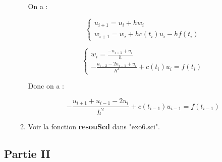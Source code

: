 \documentclass[12pt, letterpaper]{article}
\begin{document}
\begin{enumerate}
\begin{enumerate}
    On a :

    \begin{equation*}
      \left\{
      \begin{array}{l}
        u_{i+1} = u_i + h w_i \\
        w_{i+1} = w_i + h c(t_i) u_i - h f(t_i)
      \end{array}
      \right.
    \end{equation*}

    \begin{equation*}
      \left\{
      \begin{array}{l}
        w_i = \frac{- u_{i+1} + u_i}{h} \\
        - \frac{u_{i-2} - 2 u_{i-1} + u_i}{h^2} + c(t_i) u_i = f(t_i)
      \end{array}
      \right.
    \end{equation*}

    Donc on a :

    \begin{equation*}
      - \frac{u_{i+1} + u_{i-1} - 2 u_i}{h^2} + c(t_{i-1}) u_{i-1} = f(t_{i-1})
    \end{equation*}

    
  \item
    Voir la fonction \textbf{resouScd} dans "exo6.sci".
    
  \end{enumerate}
  
\end{enumerate}

\subsection*{Partie II}
\end{document}
